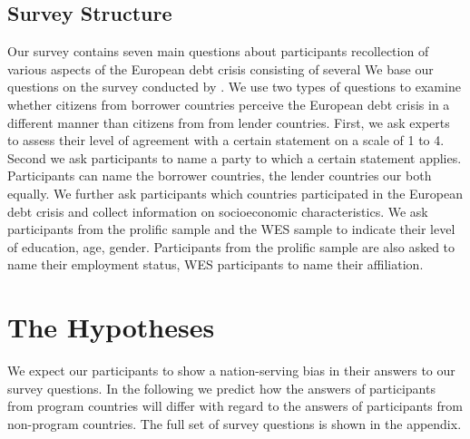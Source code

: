 \subsection{Survey Structure}
Our survey contains seven main questions about participants recollection of various aspects of the European debt crisis consisting of several  We base our questions on the survey conducted by \cite{dezso}. We use two types of questions to examine whether citizens from borrower countries perceive the European debt crisis in a different manner than citizens from from lender countries. First, we ask experts to assess their level of agreement with a certain statement on a scale of 1 to 4. Second we ask participants to name a party to which a certain statement applies. Participants can name the borrower countries, the lender countries our both equally. We further ask participants which countries participated in the European debt crisis and collect information on socioeconomic characteristics. We ask participants from the prolific sample and the WES sample to indicate their level of education, age, gender. Participants from the prolific sample are also asked to name their employment status, WES participants to name their affiliation. 

\section{The  Hypotheses}
We expect our participants to show a nation-serving bias in their answers to our survey questions. In the following we predict how the answers of participants from program countries will differ with regard to the answers of participants from non-program countries. The full set of survey questions is shown in the appendix. 


